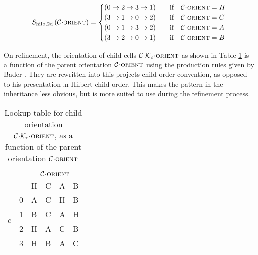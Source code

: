 \documentclass{IIBproject}
\newcommand{\acc}{{\mkern 0.5mu\cdot\mkern 0.5mu}}
\numberwithin{figure}{section}
\begin{document}
        \begin{equation}
            S_{\mathrm{hilb,2d}}\left(\mathcal{C}\acc\textproc{orient}\right) =
            \begin{cases}
                \left( 0 \to 2 \to 3 \to 1\right) & \qif \mathcal{C}\acc\textproc{orient}=H \\
                \left( 3 \to 1 \to 0 \to 2\right) & \qif \mathcal{C}\acc\textproc{orient}=C \\
                \left( 0 \to 1 \to 3 \to 2\right) & \qif \mathcal{C}\acc\textproc{orient}=A \\
                \left( 3 \to 2 \to 0 \to 1\right) & \qif \mathcal{C}\acc\textproc{orient}=B
            \end{cases}
        \end{equation}

        On refinement, the orientation of child cells $\mathcal{C}\acc\mathcal{K}_c\acc\textproc{orient}$ as shown in Table \ref{tab:hilb-Dc} is a function of the parent orientation $\mathcal{C}\acc\textproc{orient}$ using the production rules given by Bader \cite{bader2013}. They are rewritten into this projects child order convention, as opposed to his presentation in Hilbert child order. This makes the pattern in the inheritance less obvious, but is more suited to use during the refinement process.

        \begin{table}[H]
            \centering
            \caption{Lookup table for child orientation $\mathcal{C}\acc\mathcal{K}_c\acc\textproc{orient}$, as a function of the parent orientation $\mathcal{C}\acc\textproc{orient}$}
            \label{tab:hilb-Dc}
            \begin{tabular}{ll|llll}
                                 &   & \multicolumn{4}{c}{$\mathcal{C}\acc\textproc{orient}$} \\
                                 &   & H    & C    & A    & B    \\ \hline
            \multirow{4}{*}{$c$} & 0 & A    & C    & H    & B    \\
                                 & 1 & B    & C    & A    & H    \\
                                 & 2 & H    & A    & C    & B    \\
                                 & 3 & H    & B    & A    & C   
            \end{tabular}
        \end{table}
\end{document}
